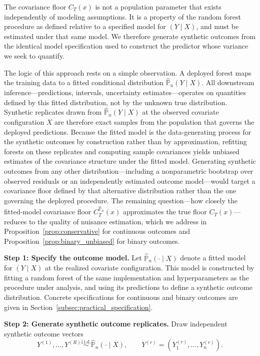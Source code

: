 \documentclass[11pt]{article}
\theoremstyle{plain}
\theoremstyle{definition}
\theoremstyle{remark}
\begin{document}
The covariance floor $C_T(x)$ is not a population parameter that exists independently of modeling assumptions. It is a property of the random forest procedure as defined relative to a specified model for $(Y\mid X)$, and must be estimated under that same model. We therefore generate synthetic outcomes from the identical model specification used to construct the predictor whose variance we seek to quantify.

The logic of this approach rests on a simple observation. A deployed forest maps the training data to a fitted conditional distribution $\widehat{\mathbb{P}}_n(Y \mid X)$. All downstream inference---predictions, intervals, uncertainty estimates---operates on quantities defined by this fitted distribution, not by the unknown true distribution. Synthetic replicates drawn from $\widehat{\mathbb{P}}_n(Y \mid X)$ at the observed covariate configuration $X$ are therefore exact samples from the population that governs the deployed predictions. Because the fitted model is the data-generating process for the synthetic outcomes by construction rather than by approximation, refitting forests on these replicates and computing sample covariances yields unbiased estimates of the covariance structure under the fitted model. Generating synthetic outcomes from any other distribution---including a nonparametric bootstrap over observed residuals or an independently estimated outcome model---would target a covariance floor defined by that alternative distribution rather than the one governing the deployed procedure. The remaining question---how closely the fitted-model covariance floor $C_T^{\widehat{\mathbb{P}}_n}(x)$ approximates the true floor $C_T(x)$---reduces to the quality of nuisance estimation, which we address in Proposition~\ref{prop:conservative} for continuous outcomes and Proposition~\ref{prop:binary_unbiased} for binary outcomes. 

\medskip
\noindent\textbf{Step 1: Specify the outcome model.}
Let $\widehat{\mathbb P}_n(\cdot\mid X)$ denote a fitted model for $(Y \mid X)$ at the realized covariate configuration. This model is constructed by fitting a random forest of the same implementation and hyperparameters as the procedure under analysis, and using its predictions to define a synthetic outcome distribution. Concrete specifications for continuous and binary outcomes are given in Section~\ref{subsec:practical_specification}.

\medskip
\noindent\textbf{Step 2: Generate synthetic outcome replicates.}
Draw independent synthetic outcome vectors
\[
Y^{(1)},\ldots,Y^{(R)}
\stackrel{\text{i.i.d.}}{\sim}
\widehat{\mathbb P}_n(\cdot\mid X),
\qquad
Y^{(r)}=(Y^{(r)}_1,\ldots,Y^{(r)}_n).
\]
\end{document}
